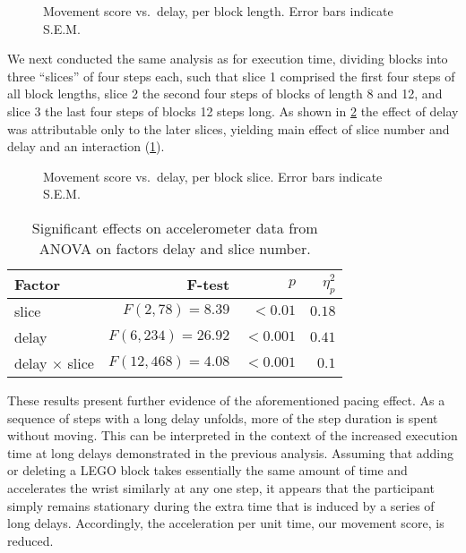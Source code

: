 \begin{figure}[h]
    \centering
    \caption{Movement score vs.\ delay, per block length. Error bars indicate S.E.M.}\label{fig:acc:delaylength}
\end{figure}

We next conducted the same analysis as for execution time, dividing blocks into three ``slices'' of four steps each, such that slice 1 comprised the first four steps of all block lengths, slice 2 the second four steps of blocks of length 8 and 12, and slice 3 the last four steps of blocks 12 steps long.
As shown in \cref{fig:acc:delayslice} the effect of delay was attributable only to the later slices, yielding main effect of slice number and delay and an interaction (\cref{tab:anova:acc:slice}). 

\begin{figure}[h]
  \centering
  \caption{Movement score vs.\ delay, per block slice. Error bars indicate S.E.M.}\label{fig:acc:delayslice}
\end{figure}

\begin{table}[h]
  \centering
  \caption{Significant effects on accelerometer data from ANOVA on factors delay and slice number.}\label{tab:anova:acc:slice}
  \setlength{\tabcolsep}{0pt} %
  \begin{tabular*}{\columnwidth}{@{\extracolsep{\fill}\quad}lrrr@{}}
    \toprule
    \textbf{Factor} & \textbf{F-test} & \textbf{\(p\)} & \textbf{\(\eta^{2}_{p}\)} \\
    \midrule 
    slice & \(F(2, 78) = 8.39\) & \(<0.01\) & \(0.18\) \\
    delay & \(F(6, 234) = 26.92\) & \(<0.001\) & \(0.41\) \\
    delay \(\times\) slice & \(F(12, 468) = 4.08\) & \(<0.001\) & \(0.1\) \\
    \bottomrule
  \end{tabular*}%
\end{table}

These results present further evidence of the aforementioned pacing effect.
As a sequence of steps with a long delay unfolds, more of the step duration is spent without moving.
This can be interpreted in the context of the increased execution time at long delays demonstrated in the previous analysis.
Assuming that adding or deleting a LEGO block takes essentially the same amount of time and accelerates the wrist similarly at any one step, it appears that the participant simply remains stationary during the extra time that is induced by a series of long delays.
Accordingly, the acceleration per unit time, our movement score, is reduced.

